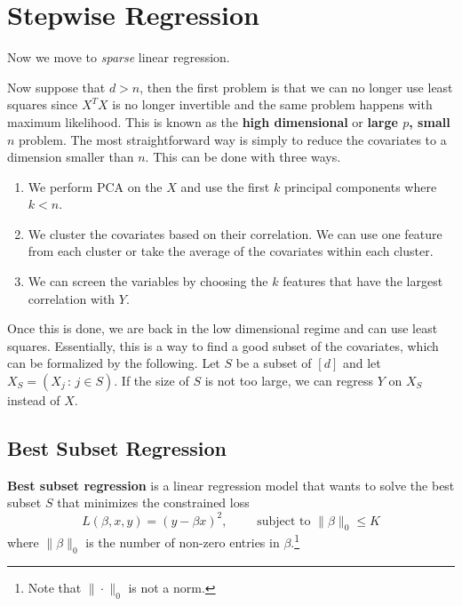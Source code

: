 \section{Stepwise Regression} 

  Now we move to \textit{sparse} linear regression. 

  Now suppose that $d > n$, then the first problem is that we can no longer use least squares since $X^T X$ is no longer invertible and the same problem happens with maximum likelihood. This is known as the \textbf{high dimensional} or \textbf{large $p$, small $n$} problem. The most straightforward way is simply to reduce the covariates to a dimension smaller than $n$. This can be done with three ways. 
  \begin{enumerate}
    \item We perform PCA on the $X$ and use the first $k$ principal components where $k < n$. 
    \item We cluster the covariates based on their correlation. We can use one feature from each cluster or take the average of the covariates within each cluster. 
    \item We can screen the variables by choosing the $k$ features that have the largest correlation with $Y$. 
  \end{enumerate}
  Once this is done, we are back in the low dimensional regime and can use least squares. Essentially, this is a way to find a good subset of the covariates, which can be formalized by the following. Let $S$ be a subset of $[d]$ and let $X_S = (X_j \,:\, j \in S)$. If the size of $S$ is not too large, we can regress $Y$ on $X_S$ instead of $X$. 

\subsection{Best Subset Regression}

  \begin{definition}
    \textbf{Best subset regression} is a linear regression model that wants to solve the best subset $S$ that minimizes the constrained loss 
    \begin{equation}
      L(\beta, x, y) =  (y - \beta x)^2, \qquad \text{ subject to } \|\beta\|_0 \leq K
    \end{equation}
    where $\|\beta\|_0$ is the number of non-zero entries in $\beta$.\footnote{Note that $\| \cdot \|_0$ is not a norm.}
  \end{definition}

